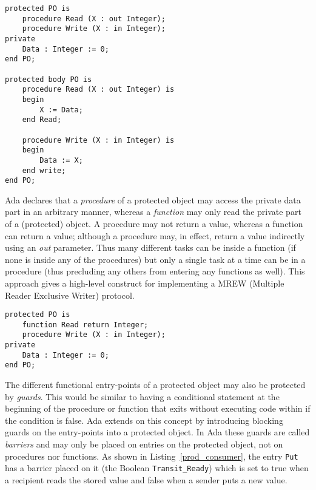 \begin{minipage}{\listingwidth}
\lstset{language=ada}
\begin{lstlisting}[caption=Declaring a protected object with
    procedures,label=po_procs]
protected PO is
	procedure Read (X : out Integer);
	procedure Write (X : in Integer);
private
	Data : Integer := 0;
end PO;

protected body PO is
	procedure Read (X : out Integer) is
	begin
		X := Data;
	end Read;

	procedure Write (X : in Integer) is
	begin
		Data := X;
	end write;
end PO;
\end{lstlisting}
\end{minipage}

Ada declares that a \emph{procedure} of a protected object may access
the private data part in an arbitrary manner, whereas a
\emph{function} may only read the private part of a (protected)
object. A procedure may not return a value, whereas a function can
return a value; although a procedure may, in effect, return a value
indirectly using an \emph{out} parameter. Thus many different tasks
can be inside a function (if none is inside any of the procedures) but
only a single task at a time can be in a procedure (thus precluding
any others from entering any functions as well). This approach gives a
high-level construct for implementing a MREW (Multiple Reader
Exclusive Writer) protocol.

\begin{minipage}{\listingwidth}
\lstset{language=ada}
\begin{lstlisting}[caption=Same protected object but with a function
    for improved parallelism,label=po_proc_and_func]
protected PO is
	function Read return Integer;
	procedure Write (X : in Integer);
private
	Data : Integer := 0;
end PO;
\end{lstlisting}
\end{minipage}

The different functional entry-points of a protected object may also
be protected by \emph{guards}. This would be similar to having a
conditional statement at the beginning of the procedure or function
that exits without executing code within if the condition is
false. Ada extends on this concept by introducing blocking guards on
the entry-points into a protected object. In Ada these guards are
called \emph{barriers} and may only be placed on entries on the
protected object, not on procedures nor functions. As shown in
Listing~\ref{prod_consumer}, the entry \texttt{Put} has a barrier
placed on it (the Boolean \texttt{Transit\_Ready}) which is set to
true when a recipient reads the stored value and false when a sender
puts a new value.

